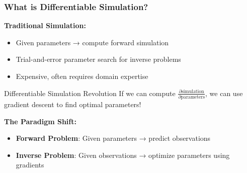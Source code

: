 \documentclass[notes]{beamer}
\begin{document}
\begin{frame}
\frametitle{What is Differentiable Simulation?}

\textbf{Traditional Simulation:}
\begin{itemize}
    \item Given parameters → compute forward simulation
    \item Trial-and-error parameter search for inverse problems
    \item Expensive, often requires domain expertise
\end{itemize}

\vspace{1cm}

\begin{alertblock}{Differentiable Simulation Revolution}
If we can compute $\frac{\partial \text{simulation}}{\partial \text{parameters}}$, we can use gradient descent to find optimal parameters!
\end{alertblock}

\textbf{The Paradigm Shift:}
\begin{itemize}
    \item \textbf{Forward Problem}: Given parameters → predict observations
    \item \textbf{Inverse Problem}: Given observations → optimize parameters using gradients
\end{itemize}

\end{frame}
\end{document}
